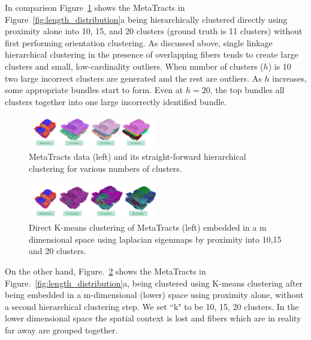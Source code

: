   
In comparison Figure~\ref{fig:comparison} shows the MetaTracts in Figure~\ref{fig:length_distribution}a being hierarchically clustered directly using proximity alone into 10, 15, and 20 clusters (ground truth is 11 clusters) without first performing orientation clustering. As discussed above, single linkage hierarchical clustering in the presence of overlapping fibers tends to create large clusters and small, low-cardinality outliers. When number of clusters ($h$) is 10 two large incorrect clusters are generated and the rest are outliers. As $h$ increases, some appropriate bundles start to form. Even at $h=20$, the top bundles all clusters together into one large incorrectly identified bundle.
\begin{figure}[h]
	\centering
	\includegraphics[width=0.5\textwidth,  trim = 0mm 10mm 0mm 10mm, clip]{images_pvis/comparison_proximity.pdf}
	\caption{MetaTracts data (left) and its straight-forward hierarchical clustering for various numbers of clusters.}
	\label{fig:comparison}
\end{figure} 
\begin{figure}[h]
	\centering
	\includegraphics[width=0.5\textwidth]{images_pvis/comparison_orient.pdf}
	\caption{Direct K-means clustering of MetaTracts (left) embedded in a m dimensional space using laplacian eigenmaps by proximity into 10,15 and 20 clusters.}
	\label{fig:comparison_orient}
\end{figure}
On the other hand, Figure.~\ref{fig:comparison_orient} shows the MetaTracts in Figure.~\ref{fig:length_distribution}a, being clustered using K-means clustering after being embedded  in a m-dimensional (lower) space using proximity alone, without a second hierarchical clustering step. We set ``k" to be  10, 15, 20 clusters. In the lower dimensional space the spatial context is lost and fibers which are in reality far away are grouped together.


